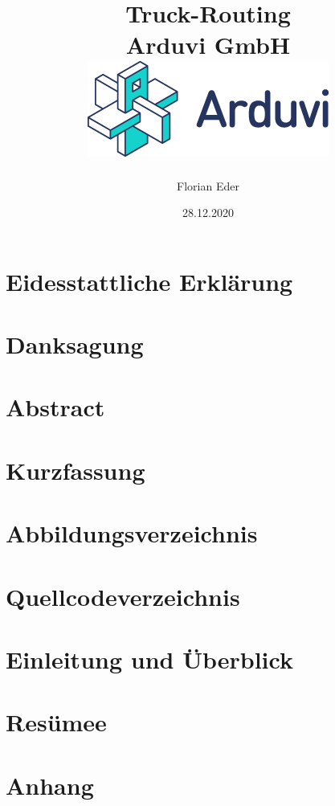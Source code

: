 \documentclass[12pt]{report}
\title {
    {Truck-Routing}\\
    {\large Arduvi GmbH}\\
    {\includegraphics{ArduviLogoWithText.png}}
}
\author{Florian Eder}
\date{28.12.2020}
\begin{document}
    \maketitle

    \chapter*{Eidesstattliche Erklärung}
    

    \chapter*{Danksagung}
    

    \chapter*{Abstract}
    

    \chapter*{Kurzfassung}
    

    \tableofcontents

    \chapter*{Abbildungsverzeichnis}
    

    \chapter*{Quellcodeverzeichnis}
    


    \chapter{Einleitung und Überblick}
    







    \chapter{Resümee}
    

    \chapter{Anhang}
    
    
\end{document}
